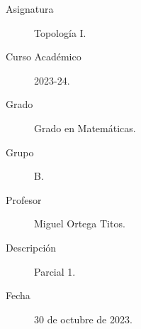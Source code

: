 \documentclass[12pt]{article}
\begin{document}

    
    

    \begin{description}
        \item[Asignatura] Topología I.
        \item[Curso Académico] 2023-24.
        \item[Grado] Grado en Matemáticas.
        \item[Grupo] B.
        \item[Profesor] Miguel Ortega Titos.
        \item[Descripción] Parcial 1.
        \item[Fecha] 30 de octubre de 2023.
    
    \end{description}
    \newpage
    
\end{document}
